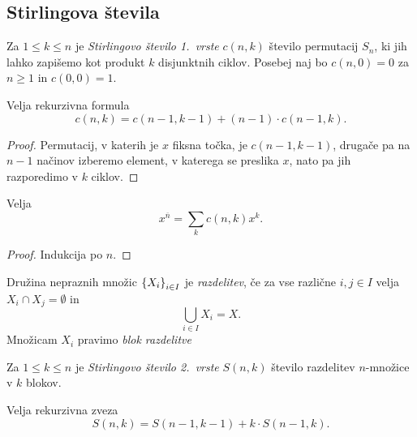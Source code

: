 \obvs

\newpage

\subsection{Stirlingova števila}

\begin{definicija}
Za $1 \leq k \leq n$ je
\emph{Stirlingovo število 1.~vrste}
$c(n,k)$ število permutacij $S_n$, ki jih lahko zapišemo kot
produkt $k$ disjunktnih ciklov. Posebej naj bo $c(n,0) = 0$ za $n \geq 1$ in
$c(0,0) = 1$.
\end{definicija}


\begin{trditev}
Velja rekurzivna formula
\[
c(n, k) = c(n-1, k-1) + (n-1) \cdot c(n-1, k).
\]
\end{trditev}

\begin{proof}
Permutacij, v katerih je $x$ fiksna točka, je $c(n-1, k-1)$,
drugače pa na $n-1$ načinov izberemo element, v katerega se
preslika $x$, nato pa jih razporedimo v $k$ ciklov.
\end{proof}

\begin{izrek}
Velja
\[
x^{\overline{n}} = \sum_k c(n, k) x^k.
\]
\end{izrek}

\begin{proof}
Indukcija po $n$.
\end{proof}

\begin{definicija}
Družina nepraznih množic $\left\{X_i\right\}_{i \in I}$ je
\emph{razdelitev}, če za vse različne
$i, j \in I$ velja $X_i \cap X_j = \emptyset$ in
\[
\bigcup_{i \in I} X_i = X.
\]
Množicam $X_i$ pravimo \emph{blok razdelitve}
\end{definicija}

\begin{definicija}
Za $1 \leq k \leq n$ je
\emph{Stirlingovo število 2.~vrste}
$S(n, k)$ število razdelitev $n$-množice v $k$ blokov.
\end{definicija}

\begin{trditev}
Velja rekurzivna zveza
\[
S(n,k) = S(n-1, k-1) + k \cdot S(n-1, k).
\]
\end{trditev}

